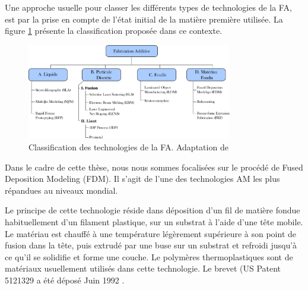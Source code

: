 
Une approche usuelle pour classer les différents types de technologies de la FA, est par la prise en compte de l'état initial de la matière première utilisée.
La figure \ref{Chap-1:Fig.AM.processes} présente la classification proposée dans ce contexte.

\begin{figure} [H]
	\centering
	\includegraphics[width=0.8\textwidth]{Figures/Francais/AM-processes.pdf}
	\caption[]{Classification des technologies de la FA. Adaptation de \parencite{Kruth1991b, Wong2012, Mueller2012}}
	\label{Chap-1:Fig.AM.processes}
\end{figure}


Dans le cadre de cette thèse, nous nous sommes focalisées sur le procédé de Fused Deposition Modeling (FDM).
Il s'agit de l'une des technologies AM les plus répandues au niveaux mondial. 

Le principe de cette technologie réside dans déposition d'un fil de matière fondue habituellement d'un filament plastique, sur un substrat à l'aide d'une tête mobile.
Le matériau est chauffé à une température légèrement supérieure à son point de fusion dans la tête, puis extrudé par une buse sur un substrat et refroidi jusqu'à ce qu'il se solidifie et forme une couche.
Le polymères thermoplastiques sont de matériaux usuellement utilisés dans cette technologie.
Le brevet (US Patent 5121329 a été déposé  Juin 1992 \parencite{Crump1988, Crump1991}.



